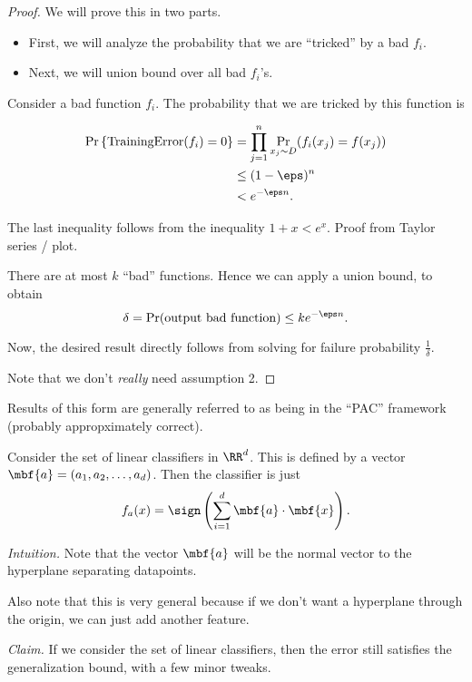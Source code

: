 \begin{proof}
  We will prove this in two parts.
  \begin{itemize}
    \item First, we will analyze the probability that we are ``tricked'' by a bad $f_i$.
    \item Next, we will union bound over all bad $f_i$'s.
  \end{itemize}

  Consider a bad function $f_i$.  The probability that we are tricked by this function is 

  \begin{align*}
   \Pr\left\{ \text{TrainingError}(f_i) = 0 \right\} &= \prod_{j=1}^{n} \Pr_{x_j \sim D} (f_i(x_j) = f(x_j)) \\
   & \leq (1-\eps)^{n} \\
   & < e^{- \eps n}.
  \end{align*}

  The last inequality follows from the inequality $1 + x < e^{x}$.  Proof from Taylor series / plot.

  There are at most $k$ ``bad'' functions.  Hence we can apply a union bound, to obtain
  \[
    \delta = \Pr(\text{output bad function}) \leq k e^{-\eps n}.
  \]

  Now, the desired result directly follows from solving for failure probability $\frac{1}{\delta}$.

  Note that we don't {\it really} need assumption 2.
\end{proof}

Results of this form are generally referred to as being in the ``PAC'' framework (probably appropximately correct).

\begin{example}
  Consider the set of linear classifiers in $\RR^d$.  This is defined by a vector $\mbf{a} = (a_1, a_2, \dots, a_d)$.  Then the classifier is just
  \[
    f_a(x) = \sign\left (\sum_{i=1}^{d} \mbf{a} \cdot \mbf{x} \right ).
  \]

  {\it Intuition.} Note that the vector $\mbf{a}$ will be the normal vector to the hyperplane separating datapoints.

  Also note that this is very general because if we don't want a hyperplane through the origin, we can just add another feature.
\end{example}

{\it Claim.} If we consider the set of linear classifiers, then the error still satisfies the generalization bound, with a few minor tweaks. \\

